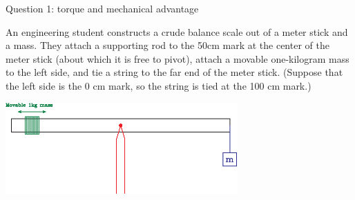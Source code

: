 \documentclass[12pt]{article}
\begin{document}
\Large
\centerline{}
\normalsize
\centerline{}
%
%
%

\centerline{\large Question 1: torque and mechanical advantage}

\begin{minipage}{0.45\textwidth}
An engineering student constructs a crude balance scale out of a meter stick and a mass. They attach a supporting rod to the 50cm mark at the center of the meter stick (about which it is free to pivot), attach a movable one-kilogram mass to the left side, and
tie a string to the far end of the meter stick. (Suppose that the left side is the 0 cm mark, so the string is tied at the 100 cm mark.) 
\end{minipage}
\begin{minipage}{0.55\textwidth}
	\begin{center}
\includegraphics[width=3.5in]{balance-scale-crop.pdf}
\end{center}
\end{minipage}
\bigskip
\end{document}
